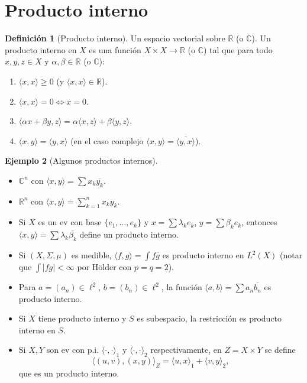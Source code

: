 \documentclass[11pt]{article}
\theoremstyle{definition}
\newtheorem{definition}{Definición}[section]
\newtheorem{example}[definition]{Ejemplo}
\theoremstyle{plain}
\begin{document}

\section*{Producto interno}

\begin{definition}[Producto interno]
Un espacio vectorial sobre $\mathbb{R}$ (o $\mathbb{C}$). Un producto interno en $X$ es una función $X\times X\to\mathbb{R}$ (o $\mathbb{C}$) tal que para todo $x,y,z\in X$ y $\alpha,\beta\in\mathbb{R}$ (o $\mathbb{C}$):
\begin{enumerate}[label=\alph*)]
\item $\langle x,x\rangle\ge 0$ (y $\langle x,x\rangle\in\mathbb{R}$).
\item $\langle x,x\rangle=0\iff x=0$.
\item $\langle\alpha x+\beta y,z\rangle=\alpha\langle x,z\rangle+\beta\langle y,z\rangle$.
\item $\langle x,y\rangle=\langle y,x\rangle$ (en el caso complejo $\langle x,y\rangle=\overline{\langle y,x\rangle}$).
\end{enumerate}
\end{definition}

\begin{example}[Algunos productos internos]
\begin{itemize}
\item $\mathbb{C}^n$ con $\langle x,y\rangle=\sum x_k\overline{y_k}$.
\item $\mathbb{R}^n$ con $\langle x,y\rangle=\sum_{k=1}^n x_k y_k$.
\item Si $X$ es un ev con base $\{e_1,\dots,e_k\}$ y $x=\sum\lambda_k e_k$, $y=\sum\beta_k e_k$, entonces
$\langle x,y\rangle=\sum \lambda_k\overline{\beta_k}$ define un producto interno.
\item Si $(X,\Sigma,\mu)$ es medible, $\langle f,g\rangle=\int f\overline{g}$ es producto interno en $L^2(X)$ (notar que $\int|fg|<\infty$ por Hölder con $p=q=2$).
\item Para $a=(a_n)\in\ell^2$, $b=(b_n)\in\ell^2$, la función $\langle a,b\rangle=\sum a_n\overline{b_n}$ es producto interno.
\item Si $X$ tiene producto interno y $S$ es subespacio, la restricción es producto interno en $S$.
\item Si $X,Y$ son ev con p.i. $\langle\cdot,\cdot\rangle_1$ y $\langle\cdot,\cdot\rangle_2$ respectivamente, en $Z=X\times Y$ se define
$$\langle (u,v),(x,y)\rangle_Z=\langle u,x\rangle_1+\langle v,y\rangle_2,$$
que es un producto interno.
\end{itemize}
\end{example}
\end{document}
